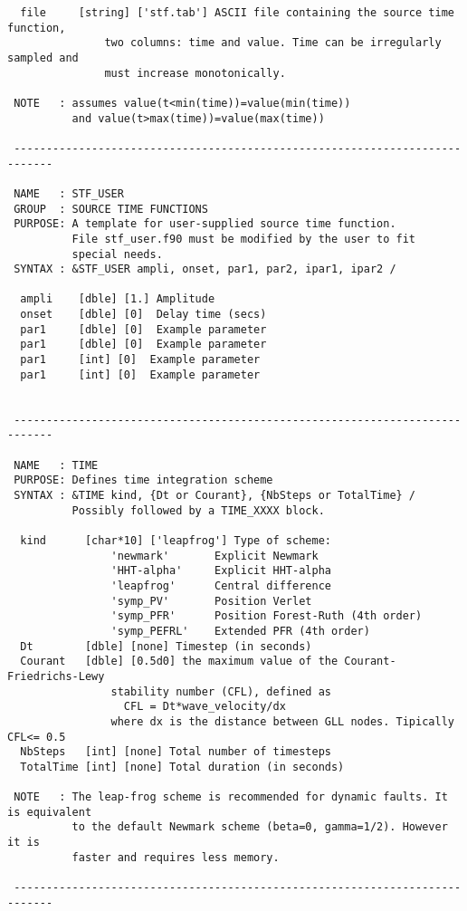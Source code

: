 \begin{verbatim}
  file     [string] ['stf.tab'] ASCII file containing the source time function,
               two columns: time and value. Time can be irregularly sampled and
               must increase monotonically.

 NOTE   : assumes value(t<min(time))=value(min(time)) 
          and value(t>max(time))=value(max(time))

 ----------------------------------------------------------------------------

 NAME   : STF_USER
 GROUP  : SOURCE TIME FUNCTIONS
 PURPOSE: A template for user-supplied source time function.
          File stf_user.f90 must be modified by the user to fit
          special needs.
 SYNTAX : &STF_USER ampli, onset, par1, par2, ipar1, ipar2 /

  ampli    [dble] [1.] Amplitude
  onset    [dble] [0]  Delay time (secs)
  par1     [dble] [0]  Example parameter
  par1     [dble] [0]  Example parameter
  par1     [int] [0]  Example parameter
  par1     [int] [0]  Example parameter


 ----------------------------------------------------------------------------

 NAME   : TIME
 PURPOSE: Defines time integration scheme
 SYNTAX : &TIME kind, {Dt or Courant}, {NbSteps or TotalTime} /
          Possibly followed by a TIME_XXXX block.

  kind      [char*10] ['leapfrog'] Type of scheme:
                'newmark'       Explicit Newmark
                'HHT-alpha'     Explicit HHT-alpha
                'leapfrog'      Central difference
                'symp_PV'       Position Verlet
                'symp_PFR'      Position Forest-Ruth (4th order)
                'symp_PEFRL'    Extended PFR (4th order)
  Dt        [dble] [none] Timestep (in seconds)
  Courant   [dble] [0.5d0] the maximum value of the Courant-Friedrichs-Lewy 
                stability number (CFL), defined as
                  CFL = Dt*wave_velocity/dx 
                where dx is the distance between GLL nodes. Tipically CFL<= 0.5
  NbSteps   [int] [none] Total number of timesteps
  TotalTime [int] [none] Total duration (in seconds)

 NOTE   : The leap-frog scheme is recommended for dynamic faults. It is equivalent 
          to the default Newmark scheme (beta=0, gamma=1/2). However it is 
          faster and requires less memory.

 ----------------------------------------------------------------------------


\end{verbatim}

